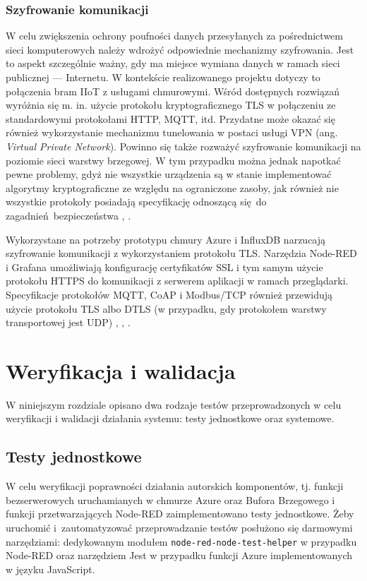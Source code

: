 \documentclass[a4paper, 12pt, twoside]{article}
\begin{document}
\subsubsection{Szyfrowanie komunikacji}

W celu zwiększenia ochrony poufności danych przesyłanych za pośrednictwem sieci
komputerowych należy wdrożyć odpowiednie mechanizmy szyfrowania. Jest to aspekt
szczególnie ważny, gdy ma miejsce wymiana danych w ramach sieci publicznej --- Internetu.
W kontekście realizowanego projektu dotyczy to połączenia bram IIoT z usługami chmurowymi.
Wśród dostępnych rozwiązań wyróżnia się m. in. użycie protokołu kryptograficznego TLS w połączeniu
ze standardowymi protokołami HTTP, MQTT, itd. Przydatne może okazać się również
wykorzystanie mechanizmu tunelowania w postaci usługi VPN (ang. \emph{Virtual Private Network}).
Powinno się także rozważyć szyfrowanie komunikacji na poziomie sieci warstwy brzegowej.
W tym przypadku można jednak napotkać pewne problemy, gdyż nie wszystkie urządzenia
są w stanie implementować algorytmy kryptograficzne ze względu
na ograniczone zasoby, jak również nie wszystkie protokoły posiadają specyfikację
odnoszącą się do zagadnień bezpieczeństwa \cite{isp}, \cite{intro-to-iot}.

Wykorzystane na potrzeby prototypu chmury Azure i InfluxDB narzucają szyfrowanie
komunikacji z wykorzystaniem protokołu TLS. Narzędzia Node-RED i Grafana
umożliwiają konfigurację certyfikatów SSL i tym samym użycie protokołu
HTTPS do komunikacji z serwerem aplikacji w ramach przeglądarki. Specyfikacje
protokołów MQTT, CoAP i Modbus/TCP również przewidują użycie protokołu TLS albo
DTLS (w przypadku, gdy protokołem warstwy transportowej jest UDP)
\cite{mqtt-tls}, \cite{modbus-tls}, \cite{coap-tls}.

\section{Weryfikacja i walidacja}\label{testy}

W niniejszym rozdziale opisano dwa rodzaje testów przeprowadzonych
w celu weryfikacji i walidacji działania systemu: testy jednostkowe oraz systemowe.

\subsection{Testy jednostkowe}

W celu weryfikacji poprawności działania autorskich komponentów, tj.
funkcji bezserwerowych uruchamianych w chmurze Azure oraz Bufora Brzegowego i funkcji przetwarzających Node-RED
zaimplementowano testy jednostkowe. Żeby uruchomić i~zautomatyzować przeprowadzanie
testów posłużono się darmowymi narzędziami: dedykowanym modułem \texttt{node-red-node-test-helper}
w przypadku Node-RED oraz narzędziem Jest w przypadku funkcji Azure implementowanych
w języku JavaScript.
\end{document}
